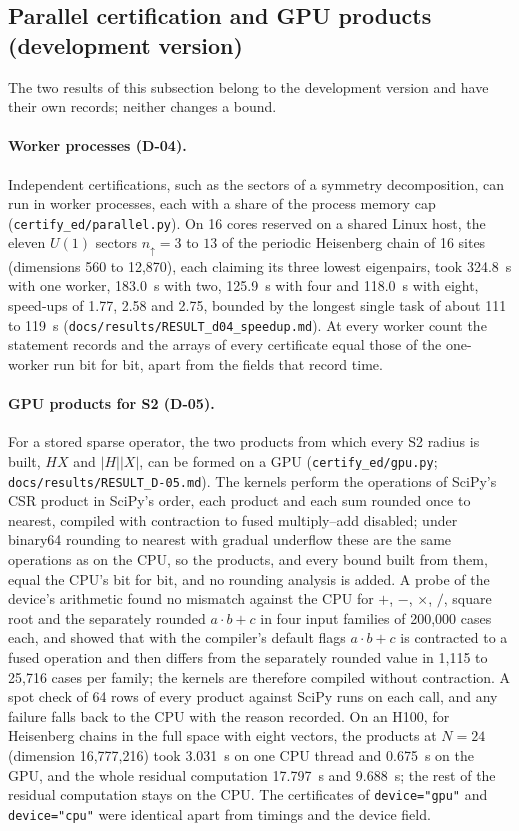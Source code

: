 \documentclass[11pt,a4paper]{article}
\newcommand{\code}[1]{\texttt{#1}}
\newcommand{\abs}[1]{\lvert #1\rvert}
\begin{document}
\subsection{Parallel certification and GPU products (development version)}

The two results of this subsection belong to the development version and have their own records; neither changes a
bound.

\paragraph{Worker processes (D-04).}
Independent certifications, such as the sectors of a symmetry decomposition, can run in worker processes, each with a
share of the process memory cap (\code{certify\_ed/parallel.py}). On 16 cores reserved on a shared Linux host, the
eleven $U(1)$ sectors $n_\uparrow=3$ to $13$ of the periodic Heisenberg chain of 16 sites (dimensions 560 to 12,870),
each claiming its three lowest eigenpairs, took 324.8~s with one worker, 183.0~s with two, 125.9~s with four and
118.0~s with eight, speed-ups of 1.77, 2.58 and 2.75, bounded by the longest single task of about 111 to 119~s
(\code{docs/results/RESULT\_d04\_speedup.md}). At every worker count the statement records and the arrays of every
certificate equal those of the one-worker run bit for bit, apart from the fields that record time.

\paragraph{GPU products for S2 (D-05).}
For a stored sparse operator, the two products from which every S2 radius is built, $HX$ and $\abs{H}\abs{X}$, can be
formed on a GPU (\code{certify\_ed/gpu.py}; \code{docs/results/RESULT\_D-05.md}). The kernels perform the operations of
SciPy's CSR product in SciPy's order, each product and each sum rounded once to nearest, compiled with contraction to
fused multiply--add disabled; under binary64 rounding to nearest with gradual underflow these are the same operations
as on the CPU, so the products, and every bound built from them, equal the CPU's bit for bit, and no rounding analysis
is added. A probe of the device's arithmetic found no mismatch against the CPU for $+$, $-$, $\times$, $/$, square root and
the separately rounded $a\cdot b+c$ in four input families of 200,000 cases each, and showed that with the compiler's
default flags $a\cdot b+c$ is contracted to a fused operation and then differs from the separately rounded value in
1,115 to 25,716 cases per family; the kernels are therefore compiled without contraction. A spot check of 64 rows
of every product against SciPy runs on each call, and any failure falls back to the CPU with the reason recorded. On an H100,
for Heisenberg chains in the full space with eight vectors, the products at $N=24$ (dimension 16,777,216) took 3.031~s
on one CPU thread and 0.675~s on the GPU, and the whole residual computation 17.797~s and 9.688~s; the rest of the
residual computation stays on the CPU. The certificates of \code{device="gpu"} and \code{device="cpu"} were identical
apart from timings and the device field.
\end{document}
